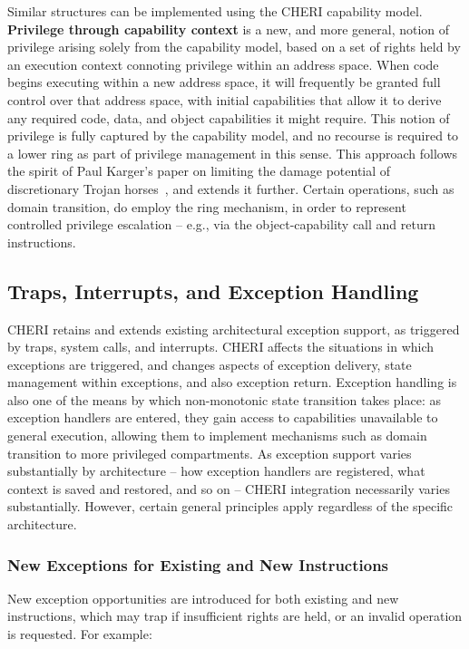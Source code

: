 Similar structures can be implemented using the CHERI capability model.
\textbf{Privilege through capability context} is a new, and more general,
notion of privilege arising solely from the capability model, based on a set of
rights held by an execution context connoting privilege within an address
space.
When code begins executing within a new address space, it will frequently be
granted full control over that address space, with initial capabilities that
allow it to derive any required code, data, and object capabilities it might
require.
This notion of privilege is fully captured by the capability model, and no
recourse is required to a lower ring as part of privilege management in this
sense.
This approach follows the spirit of Paul Karger's paper on limiting the
damage potential of discretionary Trojan horses~\cite{Karger87}, and extends
it further.
Certain operations, such as domain transition, do employ the ring mechanism,
in order to represent controlled privilege escalation -- e.g., via the
object-capability call and return instructions.

\subsection{Traps, Interrupts, and Exception Handling}
\label{sec:traps_interrupts_exception_handling}

CHERI retains and extends existing architectural exception support, as
triggered by traps, system calls, and interrupts.
CHERI affects the situations in which exceptions are triggered, and changes
aspects of exception delivery, state management within exceptions, and also
exception return.
Exception handling is also one of the means by which non-monotonic state
transition takes place: as exception handlers are entered, they gain access to
capabilities unavailable to general execution, allowing them to implement
mechanisms such as domain transition to more privileged compartments.
As exception support varies substantially by architecture -- how exception
handlers are registered, what context is saved and restored, and so on --
CHERI integration necessarily varies substantially.
However, certain general principles apply regardless of the specific
architecture.

\subsubsection{New Exceptions for Existing and New Instructions}

New exception opportunities are introduced for both existing and new
instructions, which may trap if insufficient rights are held, or an invalid
operation is requested.
For example:

